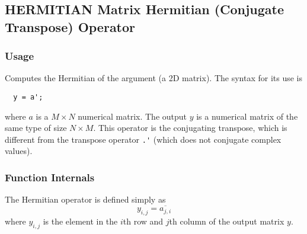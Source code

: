 %
%
%
\subsection{HERMITIAN Matrix Hermitian (Conjugate Transpose) Operator}
\subsubsection{Usage}
Computes the Hermitian of the argument (a 2D matrix).  The syntax for its use is
\begin{verbatim}
  y = a';
\end{verbatim}
where $a$ is a $M \times N$ numerical matrix.  The output $y$ is a numerical matrix
of the same type of size $N \times M$.  This operator is the conjugating transpose,
which is different from the transpose operator \verb|.'| (which does not 
conjugate complex values).
\subsubsection{Function Internals}
The Hermitian operator is defined simply as
\[
  y_{i,j} = \overline{a_{j,i}}
\]
where $y_{i,j}$ is the element in the $i$th row and $j$th column of the output matrix $y$.
